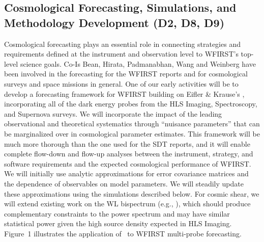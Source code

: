 
\subsection{Cosmological Forecasting, Simulations, and Methodology Development (D2, D8, D9)}
\label{sec:wl_methodology}


Cosmological forecasting plays
an essential role in connecting strategies and requirements defined at
the instrument and observation level to WFIRST's top-level science goals.
Co-Is Bean, Hirata, Padmanabhan, Wang and Weinberg have been
involved in the forecasting for the WFIRST reports and
for cosmological surveys and space missions in general.
One of our early activities will be to develop a forecasting
framework for WFIRST building on Eifler \& Krause's \CoLi, incorporating all of the dark
energy probes from the HLS Imaging, Spectroscopy, and Supernova surveys.
We will incorporate the impact of the leading observational and theoretical systematics
through ``nuisance parameters'' that can be marginalized over in cosmological
parameter estimates.  This framework will be much more thorough
than the one used for the SDT reports, and it will enable complete
flow-down and flow-up analyses between the instrument, strategy, and
software requirements and the expected cosmological performance of
WFIRST.  We will initially use analytic approximations for error covariance
matrices and the dependence of observables on model parameters.  We will
steadily update these approximations using the simulations described below.
For cosmic shear, we will extend existing work on the WL bispectrum
(e.g., \cite{Kayo2013,Fu14}), which should
produce complementary constraints to the power spectrum and may have
similar statistical power given the high source density expected in
HLS Imaging.  Figure~1 illustrates the application of \CoLi\ to WFIRST
multi-probe forecasting.

